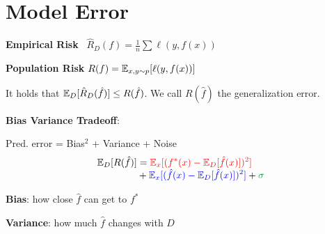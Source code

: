\section*{Model Error}

\textbf{Empirical Risk} \quad \ $\hat R_D(f) = \frac{1}{n} \sum \mathcal \ell(y, f(x))$

\textbf{Population Risk} \quad $R(f) = \mathbb{E}_{x,y \sim p}[\ell(y, f(x))]$

It holds that $\mathbb{E}_D[\hat R_D (\hat f)] \leq R(\hat f)$. We call $R(\hat f)$ the generalization error.

\textbf{Bias Variance Tradeoff}:

Pred. error = \color{red} Bias$^2$ \color{black} + \color{blue} Variance \color{black} + \color{ForestGreen} Noise \color{black}
\begin{align*}
	\E_D[R(\hat f)] &= \color{red} \E_x[(f^*(x) - \E_D[\hat f(x)])^2] \\[-4pt]
	&+ \color{blue} \E_x[(\hat f(x) - \E_D[\hat f(x)])^2] \color{black} + \color{ForestGreen} \sigma
\end{align*}

\textbf{Bias}: how close $\hat f$ can get to $f^*$

\textbf{Variance}: how much $\hat f$ changes with $D$
